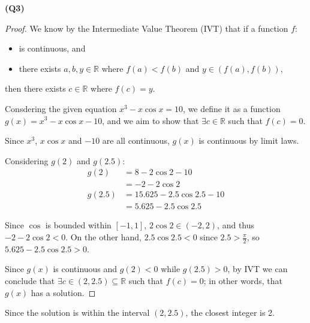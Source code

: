 \documentclass[12pt, a4paper]{article}
\newcommand{\R}{\mathbb{R}}
\begin{document}
\textbf{(Q3)} 
\begin{proof}
    We know by the Intermediate Value Theorem (IVT) that if a function $f$:
    \begin{itemize}
        \item is continuous, and
        \item there exists $a,b, y\in \R$ where $f(a) < f(b)$ and $y \in (f(a), f(b))$,
    \end{itemize}

    then there exists $c \in \R$ where $f(c) = y$.

    Consdering the given equation $x^3 - x \cos x = 10$, we define it as a function
    $g(x) = x^3 - x \cos x - 10$, and we aim to show that $\exists c \in \R$ such that $f(c) = 0$.

    Since $x^3$, $x \cos x$ and $-10$ are all continuous, $g(x)$ is continuous by limit laws.

    Considering $g(2)$ and $g(2.5)$:
    \begin{align*}
        g(2) & = 8 - 2 \cos 2 - 10\\
        & = -2 - 2 \cos 2\\
        g(2.5) & = 15.625 - 2.5 \cos 2.5 - 10\\
        & = 5.625 - 2.5 \cos 2.5
    \end{align*}

    Since $\cos$ is bounded within $[-1, 1]$, $2 \cos 2 \in (-2, 2)$, and thus $-2 -2 \cos 2 < 0$.
    On the other hand, $2.5 \cos 2.5 < 0$ since $2.5 > \frac{\pi}{2}$, so $5.625 - 2.5 \cos 2.5 > 0$.

    Since $g(x)$ is continuous and $g(2) < 0$ while $g(2.5) > 0$, by IVT we can conclude that
    $\exists c \in (2, 2.5) \subseteq \R$ such that $f(c) = 0$; in other words, that $g(x)$ has a solution.
\end{proof}

Since the solution is within the interval $(2, 2.5)$, the closest integer is 2.
\end{document}
